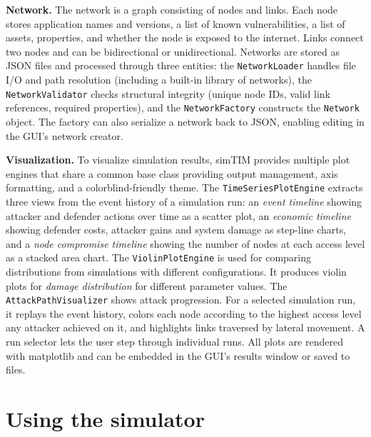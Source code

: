 \documentclass{llncs}
\begin{document}
\textbf{Network.}
The network is a graph consisting of nodes and links. Each node stores application names and versions, a list of known vulnerabilities, a list of assets, properties, and whether the node is exposed to the internet. Links connect two nodes and can be bidirectional or unidirectional.
Networks are stored as JSON files and processed through three entities: the \texttt{NetworkLoader} handles file I/O and path resolution (including a built-in library of networks), the \texttt{NetworkValidator} checks structural integrity (unique node IDs, valid link references, required properties), and the \texttt{NetworkFactory} constructs the \texttt{Network} object. The factory can also serialize a network back to JSON, enabling editing in the GUI's network creator.

\textbf{Visualization.}
To visualize simulation results, simTIM provides
multiple plot engines that share a common base class providing output management, axis formatting, and a colorblind-friendly theme.
The \texttt{TimeSeriesPlotEngine} %
extracts three views from the event history of a simulation run: an \emph{event timeline} showing attacker and defender actions over time as a scatter plot, an \emph{economic timeline} showing defender costs, attacker gains and system damage as step-line charts, and a \emph{node compromise timeline} showing the number of nodes at each access level as a stacked area chart.
The \texttt{ViolinPlotEngine} is used %
for comparing distributions from simulations with different configurations.
It produces violin plots for \emph{damage distribution} %
for different parameter values.
The \texttt{AttackPathVisualizer} shows attack progression. For a selected simulation run, it replays the event history, colors each node according to the highest access level any attacker achieved on it, and highlights links traversed by lateral movement. A run selector lets the user step through individual runs.
All plots are rendered with matplotlib and can be embedded in the GUI's results window or saved to files.




\section{Using the simulator}
\end{document}
